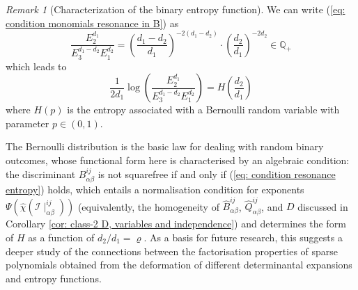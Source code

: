 \documentclass[10pt]{article}
\theoremstyle{remark}%
\newtheorem{rem}{Remark}%
\theoremstyle{definition}%
\begin{document}
\begin{rem}[Characterization of the binary entropy function]
\label{rem: characterization of the binary entropy function}
We can write (\ref{eq: condition monomials resonance in B}) as
 \begin{equation}
\frac{E_{2}^{d_{1}}}{E_{3}^{d_{1}-d_{2}}E_{1}^{d_{2}}}=\left(\frac{d_{1}-d_{2}}{d_{1}}\right)^{-2(d_{1}-d_{2})}\cdot\left(\frac{d_{2}}{d_{1}}\right)^{-2d_{2}}\in\mathbb{Q}_{+}\label{eq: condition monomials resonance in B, rational factor}
 \end{equation}
which leads to  
 \begin{equation}
\frac{1}{2d_{1}}\log\left(\frac{E_{2}^{d_{1}}}{E_{3}^{d_{1}-d_{2}}E_{1}^{d_{2}}}\right)=H\left(\frac{d_{2}}{d_{1}}\right)
\label{eq: condition resonance entropy}
 \end{equation}
where $H(p)$ is the entropy associated with a Bernoulli random variable with parameter $p\in(0,1)$. 

The Bernoulli distribution is the basic law for dealing with random binary outcomes, whose functional form here is characterised by an algebraic condition: the discriminant $B_{\alpha\beta}^{ij}$ is not squarefree if and only if (\ref{eq: condition resonance entropy}) holds, which entails a normalisation condition for exponents $\Psi(\hat{\chi}(\mathcal{I}\mid_{\alpha\beta}^{ij}))$ (equivalently, the homogeneity of $\hat{B}_{\alpha\beta}^{ij}$, $\hat{Q}_{\alpha\beta}^{ij}$, and $D$ discussed in Corollary \ref{cor: class-2 D, variables and independence}) and determines the form of $H$ as a function of $d_{2}/d_{1}=\varrho$. As a basis for future research, this suggests a deeper study of the connections between the factorisation properties of sparse polynomials obtained from the deformation of different determinantal expansions and entropy functions. 
\end{rem}
\end{document}
